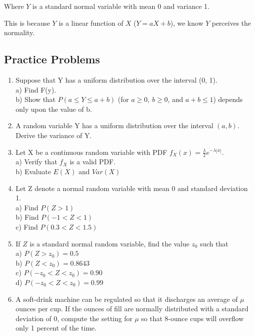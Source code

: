 \documentclass[11pt]{article}
\begin{document}
Where $Y$ is a standard normal variable with mean 0 and variance 1.

This is because $Y$ is a linear function of $X$ ($Y = aX + b$), we know $Y$ perceives the normality.

\subsection{Practice Problems}
\begin{enumerate}
  \item Suppose that Y has a uniform distribution over the interval (0, 1). \\
  a) Find F(y). \\
  b) Show that $P(a \leq Y \leq a+b)$ (for $a \geq 0 , \: b \geq 0$, and $ a+b \leq 1$) depends only upon the value of b.
  \item A random variable Y has a uniform distribution over the interval $(a, b)$. Derive the variance of Y.
  \item Let X be a continuous random variable with PDF $f_X(x) = \frac{\lambda}{2} e^{-\lambda |x|}$. \\
  a) Verify that $f_X$ is a valid PDF. \\
  b) Evaluate $E(X)$ and $Var(X)$ 
  \item Let Z denote a normal random variable with mean 0 and standard deviation 1. \\
  a) Find $P(Z > 1)$ \\
  b) Find $P(-1 < Z < 1)$ \\
  c) Find $P(0.3 < Z < 1.5)$
  \item If $Z$ is a standard normal random variable, find the value $z_0$ such that \\
  a) $P(Z > z_0) = 0.5$ \\
  b) $P(Z < z_0) = 0.8643$ \\
  c) $P(-z_0 < Z < z_0) = 0.90$ \\
  d) $P(-z_0 < Z < z_0) = 0.99$ 
  \item A soft-drink machine can be regulated so that it discharges an average of $\mu$ ounces per cup. 
  If the ounces of fill are normally distributed with a standard deviation of 0, compute the setting for $\mu$ so that 8-ounce cups will overflow only 1 percent of the time.
\end{enumerate}
\end{document}

